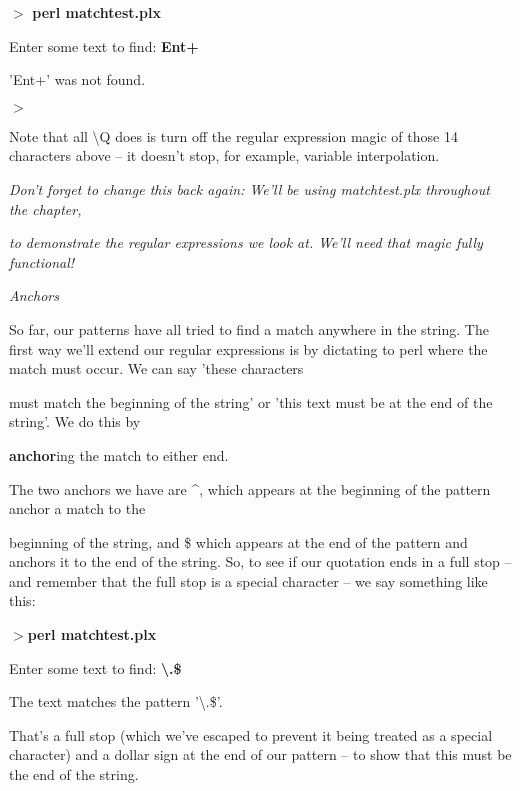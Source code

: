 \documentclass[a4paper,11pt]{book}
\begin{document}
\noindent 

\noindent $>$ \textbf{perl matchtest.plx}

\noindent Enter some text to find: \textbf{Ent+}

\noindent 'Ent+' was not found.

\noindent $>$

\noindent 

\noindent Note that all \textbackslash Q does is turn off the regular expression magic of those 14 characters above -- it doesn't stop, for example, variable interpolation.

\noindent 

\noindent \textit{Don't forget to change this back again: We'll be using matchtest.plx throughout the chapter,}

\noindent \textit{to demonstrate the regular expressions we look at. We'll need that magic fully functional!}

\noindent 

\noindent \textit{Anchors}

\noindent So far, our patterns have all tried to find a match anywhere in the string. The first way we'll extend our regular expressions is by dictating to perl where the match must occur. We can say 'these characters

\noindent must match the beginning of the string' or 'this text must be at the end of the string'. We do this by

\noindent \textbf{anchor}ing the match to either end.

\noindent 

\noindent 

\noindent The two anchors we have are \^{}, which appears at the beginning of the pattern anchor a match to the

\noindent beginning of the string, and \$ which appears at the end of the pattern and anchors it to the end of the string. So, to see if our quotation ends in a full stop -- and remember that the full stop is a special character -- we say something like this:

\noindent 

\noindent $>$\textbf{perl matchtest.plx}

\noindent Enter some text to find: \textbf{\textbackslash .\$}

\noindent The text matches the pattern '\textbackslash .\$'.

\noindent 

\noindent That's a full stop (which we've escaped to prevent it being treated as a special character) and a dollar sign at the end of our pattern -- to show that this must be the end of the string.
\end{document}
